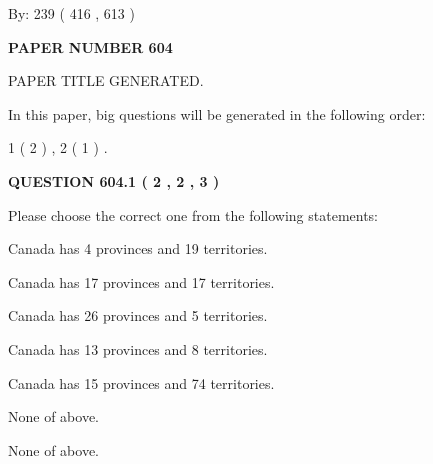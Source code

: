 \documentclass[12pt]{article}
\begin{document}
   
\hspace{1.0in} By: 
 239 ( 416 ,  613 )
   
   
   
   
\newpage 
\setcounter{page}{ 
   604001 } 
   
   
   
   
 {\textbf{ \Large{ PAPER NUMBER  604  }}}
   
   
\vspace{0.2in}
   
   
   
   
   
   
   
   
 \vspace{0.2in}
 
 
 
 
   
   
 PAPER TITLE GENERATED.
   
   
   
\vspace{0.2in}
   
In this paper, big questions will be generated in the following order: 
   
   
   1 ( 2 )
 ,
   2 ( 1 )
 .
  
\vspace{0.2in}
  
{\textbf{\Large{QUESTION
604.1 
 ( 2 , 2 , 3 )
}}}
  
  
Please choose the correct one from the following statements:
 
 
Canada has   4 provinces and  19 territories.
 
 
Canada has  17 provinces and  17 territories.
 
 
Canada has  26 provinces and  5 territories.
 
 
Canada has  13 provinces and  8 territories.
 
 
Canada has  15 provinces and  74 territories.
 
 
 None of above.
 
 
\noindent{}
 
 
 None of above.
 
\end{document}
